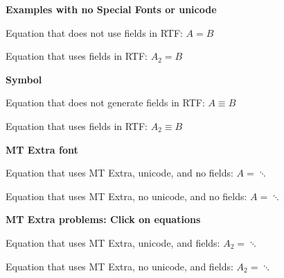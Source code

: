 ﻿\documentclass{article}
\begin{document}
\textbf{Examples with no Special Fonts or unicode}

Equation that does not use fields in RTF: $A = B$

Equation that uses fields in RTF: $A_2 = B$

\textbf{Symbol}

Equation that does not generate fields in RTF: $A\equiv B$

Equation that uses fields in RTF: $A_2 \equiv B$

\textbf{MT Extra font}

Equation that uses MT Extra, unicode, and no fields: $A = \ddots$

Equation that uses MT Extra, no unicode, and no fields: $A = \ddots$

\textbf{MT Extra problems:  Click on equations}

Equation that uses MT Extra, unicode, and fields: $A_2 = \ddots$

Equation that uses MT Extra, no unicode, and fields: $A_2 = \ddots$
\end{document}
